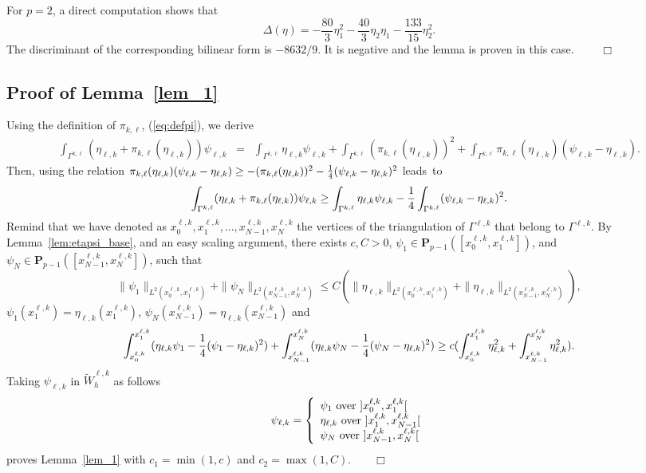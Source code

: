 \documentclass[final]{siamltex}
\begin{document}
For $p=2$, a direct computation shows that 
\[
\Delta(\eta) =-\frac{80}{3} \eta_1^2-\frac{40}{3} \eta_2\eta_1-\frac{133}{15}\eta_2^2.
\]
The discriminant of the corresponding bilinear form is $-8632/9$. It is negative and the lemma is proven in this case.
$\qquad \Box$

\subsection{Proof of Lemma~\ref{lem_1}}
Using the definition of $\pi_{k,\ell}$, (\ref{eq:defpi}), we derive
\begin{eqnarray}
\int_{\Gamma^{k,\ell}}(\eta_{\ell,k}+\pi_{k,\ell}(\eta_{\ell,k}))\psi_{\ell,k}
&=&\int_{\Gamma^{k,\ell}} \eta_{\ell,k}\psi_{\ell,k} + \int_{\Gamma^{k,\ell}}
(\pi_{k,\ell}(\eta_{\ell,k}))^2
+ \int_{\Gamma^{k,\ell}}
\pi_{k,\ell}(\eta_{\ell,k})(\psi_{\ell,k} - \eta_{\ell,k}). \nonumber
\end{eqnarray}
Then, using the relation
$\pi_{k,\ell}(\eta_{\ell,k})(\psi_{\ell,k} - \eta_{\ell,k})
\ge - (\pi_{k,\ell}(\eta_{\ell,k}))^2-{1 \over
4}(\psi_{\ell,k} - \eta_{\ell,k})^2$
leads~to
\begin{eqnarray}
\int_{\Gamma^{k,\ell}}(\eta_{\ell,k}+\pi_{k,\ell}(\eta_{\ell,k}))\psi_{\ell,k}
\ge \int_{\Gamma^{k,\ell}} \eta_{\ell,k}\psi_{\ell,k}  -{1 \over 4}
\int_{\Gamma^{k,\ell}} (\psi_{\ell,k} - \eta_{\ell,k})^2. \nonumber
\end{eqnarray}
  Remind that we have denoted as
$x_0^{\ell,k},
x_1^{\ell,k},...,x_{N-1}^{\ell,k}, x_N^{\ell,k}$ the vertices of the
triangulation of $\Gamma^{\ell,k}$ that belong to $\Gamma^{\ell,k}$.
By Lemma~\ref{lem:etapsi_base}, and an easy 
scaling argument,
there exists $c, C >0$, $\psi_1 \in {\mathbf{P}}_{p-1}([x_0^{\ell,k},x_1^{\ell,k}])$, and
 $\psi_N \in {\mathbf{P}}_{p-1}([x_{N-1}^{\ell,k},x_N^{\ell,k}])$, such that
\[
\| \psi_1\|_{L^2(x_0^{\ell,k},x_1^{\ell,k})} + \|
\psi_N\|_{L^2(x_{N-1}^{\ell,k},x_N^{\ell,k})} \le C  (\|
\eta_{\ell,k}\|_{L^2(x_0^{\ell,k},x_1^{\ell,k})} +
\|
\eta_{\ell,k}\|_{L^2(x_{N-1}^{\ell,k},x_N^{\ell,k})}),
\]
$\psi_1(x_1^{\ell,k})=\eta_{\ell,k}(x_1^{\ell,k})$,
$\psi_N(x_{N-1}^{\ell,k})=\eta_{\ell,k}(x_{N-1}^{\ell,k})$ and
\[
\int_{x_0^{\ell,k}}^{x_1^{\ell,k}} (\eta_{\ell,k} \psi_1  -{1 \over 4}
  (\psi_1 - \eta_{\ell,k})^2)
+ \int_{x_{N-1}^{\ell,k}}^{x_N^{\ell,k}} (\eta_{\ell,k} \psi_N  -{1 \over 4}
  (\psi_N - \eta_{\ell,k})^2)
\ge c (\int_{x_0^{\ell,k}}^{x_1^{\ell,k}} \eta_{\ell,k}^2+
\int_{x_{N-1}^{\ell,k}}^{x_N^{\ell,k}}
\eta_{\ell,k}^2 ).
\]
Taking
  $\psi_{\ell,k}$ in
$\tilde W_h^{\ell,k}$ as follows
\begin{eqnarray}
\psi_{\ell,k}=\left\{
\begin{array}{l}
  \psi_1
\hbox{ over }
]x_0^{\ell,k}, x_{1}^{\ell,k}[\\
\eta_{\ell,k}\hbox{ over }
]x_1^{\ell,k}, x_{N-1}^{\ell,k}[\\
\psi_N
\hbox{ over }
]x_{N-1}^{\ell,k}, x_{N}^{\ell,k}[\\
\end{array}\right.\nonumber
\end{eqnarray}
proves Lemma~\ref{lem_1} with $c_1=\min(1,c)$ and $c_2=\max(1,C)$.$\qquad \Box$
\end{document}
